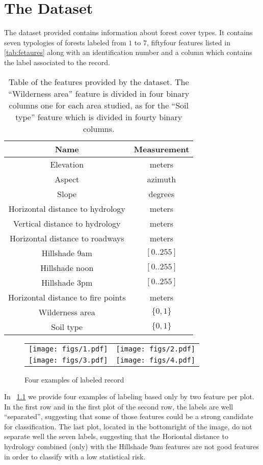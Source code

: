 
\chapter{The Dataset}
The dataset provided contains information about forest cover types. It contains seven typologies of forests labeled from $1$ to $7$, fiftyfour features listed in \autoref{tab:fetaures} along with an identification number and a column which contains the label associated to the record.
\begin{table}[htpb]
	\centering
\begin{tabular}{|c|c|}
	\hline 
	\textbf{Name} & \textbf{Measurement} \\ 
	\hline 
	Elevation & meters \\ 
	\hline 
	Aspect & azimuth \\ 
	\hline 
	Slope & degrees \\ 
	\hline 
	Horizontal distance to hydrology & meters \\ 
	\hline 
	Vertical distance to hydrology & meters \\ 
	\hline 
	Horizontal distance to roadways & meters \\ 
	\hline 
	Hillshade 9am & $[0..255]$ \\ 
	\hline 
	Hillshade noon & $[0..255]$ \\ 
	\hline 
	Hillshade 3pm & $[0..255]$ \\ 
	\hline 
	Horizontal distance to fire points & meters \\ 
	\hline 
	Wilderness area & $\lbrace0, 1\rbrace$ \\ 
	\hline 
	Soil type & $\lbrace0, 1\rbrace$ \\ 
	\hline 
\end{tabular}
\caption{Table of the features provided by the dataset. The ``Wilderness area'' feature is divided in four binary columns one for each area studied, as for the ``Soil type'' feature which is divided in fourty binary columns.}
\label{tab:fetaures}
\end{table}
\begin{figure}[htpb]
	\centering
	\begin{tabular}{cc}
		\texttt{[image: figs/1.pdf]}	& \texttt{[image: figs/2.pdf]}\\ 
		\texttt{[image: figs/3.pdf]} & \texttt{[image: figs/4.pdf]} \\ 
	\end{tabular} 
	\caption{Four examples of labeled record}
	\label{fig:plots}
\end{figure}
In \figurename~\ref{fig:plots} we provide four examples of labeling based only by two feature per plot. In the first row and in the first plot of the second row, the labels are well ``separated'', suggesting that some of those features could be a strong candidate for classification. The last plot, located in the bottom\-right of the image, do not separate well the seven labels, suggesting that the Horiontal distance to hydrology combined (only) with the Hillshade 9am features are not good features in order to classify with a low statistical risk.